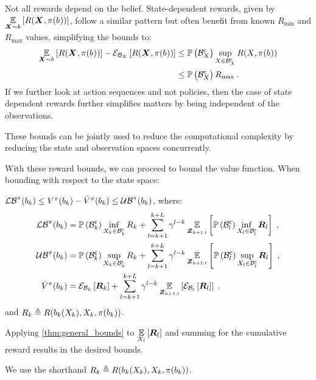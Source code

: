 Not all rewards depend on the belief. State-dependent rewards, given by $\expectation{R(\statesRV{},\pi(\blf{}))}{\statesRV{}\sim\blf{}}$, follow a similar pattern but often benefit from known $R_{\min}$ and $R_{\max}$ values, simplifying the bounds to:
\begin{equation}
	\begin{split}
		\expectation{R(\statesRV{},\pi(\blf{}))}{\statesRV{}\sim\blf{}}-\partialexpectation{R(\statesRV{},\pi(\blf{}))}{\subSpaceI{\states{}}}&\leq\measure{\stcompI{\subSpace}{\states{}}}\sup_{\states{}\in\stcompI{\subSpace}{\states{}}}R(\states{},\pi(\blf{}))             \\
		 &\leq\measure{\stcompI{\subSpace}{\states{}}}R_{\max}\;.
	\end{split}
\end{equation}
If we further look at action sequences and not policies, then the case of state dependent rewards further simplifies matters by being independent of the observations.

These bounds can be jointly used to reduce the computational complexity by reducing the state and observation spaces concurrently.

With these reward bounds, we can proceed to bound the value function. When bounding with respect to the state space:
\begin{corollaryE}
	\label{thm:val_func_bounds_states}
	$\lowerbound^\pi(\blf{k})\leq V^\pi(\blf{k})-\bar{V}^\pi(\blf{k})\leq\upperbound^\pi(\blf{k})$, where:
	\begin{subequations}
		\begin{align}
			\lowerbound\nolimits^\pi(\blf{k})& =\measure{\stcompI{\subSpace}{k}}\inf_{\states{k}\in\stcompI{\subSpace}{k}}R_k+\sum_{l=k+1}^{k+L}\gamma^{l-k}\expectation{\measure{\stcompI{\subSpace}{l}}\inf_{\states{l}\in\stcompI{\subSpace}{l}}\boldsymbol{R}_l}{\observationsRV{k+1:l}}\;,\\
			\upperbound\nolimits^\pi(\blf{k}) & =\measure{\stcompI{\subSpace}{k}}\sup_{\states{k}\in\stcompI{\subSpace}{k}}R_k+\sum_{l=k+1}^{k+L}\gamma^{l-k}\expectation{\measure{\stcompI{\subSpace}{l}}\sup_{\states{l}\in\stcompI{\subSpace}{l}}\boldsymbol{R}_l}{\observationsRV{k+1:l}}\;,\\
			\bar{V}^\pi(\blf{k}) & =\partialexpectation{\boldsymbol{R}_k}{\subSpaceI{k}}+\sum_{l=k+1}^{k+L}\gamma^{l-k}\expectation{\partialexpectation{\boldsymbol{R}_l}{\subSpaceI{l}}}{\observationsRV{k+1:l}}\;.
		\end{align}
	\end{subequations}
	and $R_k\triangleq R(\blf{k}(\states{k}),\states{k},\pi(\blf{k}))$.
\end{corollaryE}
\begin{proofE}
	Applying \cref{thm:general_bounds} to $\expectation{\boldsymbol{R}_l}{\states{l}}$ and summing for the cumulative reward results in the desired bounds.
\end{proofE}
\noindent We use the shorthand $R_k\triangleq R(\blf{k}(\states{k}),\states{k},\pi(\blf{k}))$.

